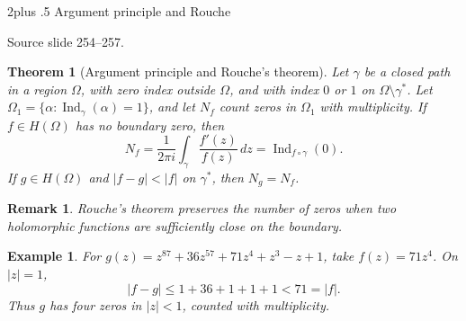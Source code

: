 \documentclass[10pt,letterpaper,twoside,openright]{amsbook}
\makeatletter
\numberwithin{equation}{subsection}
\renewcommand{\section}{\@startsection{section}{1}
 {\z@}{2\baselineskip plus .5\baselineskip}
 {\baselineskip}{\normalfont\Large\bfseries\centering}}
\theoremstyle{sea-plain}
\newtheorem{theorem}[subsection]{Theorem}
\theoremstyle{sea-definition}
\newtheorem{example}[subsection]{Example}
\newtheorem{remark}[subsection]{Remark}
\theoremstyle{sea-exercise}
\DeclareMathOperator{\Ind}{Ind}
\newcommand{\src}[1]{\par\smallskip\noindent
 {\scriptsize\sffamily\color{SoftWhite}Source slide #1.}\par\nopagebreak\smallskip}
\makeatother
\begin{document}
\section{Argument principle and Rouche}
\src{254--257}
\begin{theorem}[Argument principle and Rouche's theorem]
Let $\gamma$ be a closed path in a region $\Omega$, with zero index
outside $\Omega$, and with index $0$ or $1$ on $\Omega\setminus\gamma^*$.
Let $\Omega_1=\{\alpha:\Ind_\gamma(\alpha)=1\}$, and let $N_f$ count
zeros in $\Omega_1$ with multiplicity.
If $f\in H(\Omega)$ has no boundary zero, then
\[
N_f=\frac1{2\pi i}\int_\gamma\frac{f'(z)}{f(z)}\,dz
=\Ind_{f\circ\gamma}(0).
\]
If $g\in H(\Omega)$ and $|f-g|<|f|$ on $\gamma^*$, then $N_g=N_f$.
\end{theorem}
\begin{remark}
Rouche's theorem preserves the number of zeros when two holomorphic
functions are sufficiently close on the boundary.
\end{remark}
\begin{example}
For $g(z)=z^{87}+36z^{57}+71z^4+z^3-z+1$, take $f(z)=71z^4$.
On $|z|=1$,
\[
|f-g|\le1+36+1+1+1<71=|f|.
\]
Thus $g$ has four zeros in $|z|<1$, counted with multiplicity.
\end{example}
\end{document}

